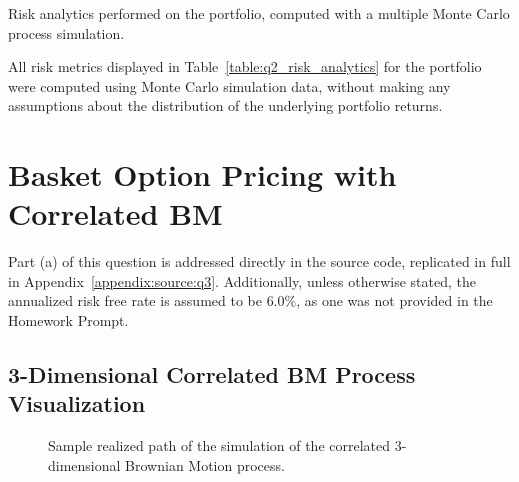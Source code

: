 \documentclass[10pt]{article}
\begin{document}
\begin{table}[!h]
    \centering
    \caption{Risk analytics performed on the portfolio, computed with a multiple Monte Carlo process simulation.}
    \label{table:q2_risk_analytics}
\end{table}

All risk metrics displayed in Table~\ref{table:q2_risk_analytics} for the portfolio were computed using Monte Carlo simulation data, without making any assumptions about the distribution of the underlying portfolio returns.


\newpage
\section{Basket Option Pricing with Correlated BM}

Part (a) of this question is addressed directly in the source code, replicated in full in Appendix~\ref{appendix:source:q3}. Additionally, unless otherwise stated, the annualized risk free rate is assumed to be $6.0\%$, as one was not provided in the Homework Prompt.

\subsection{3-Dimensional Correlated BM Process Visualization}

\begin{figure}[!ht]
    \centering
    \caption{Sample realized path of the simulation of the correlated 3-dimensional Brownian Motion process.}
    \label{fig:3d_process_viz}
\end{figure}
\end{document}
